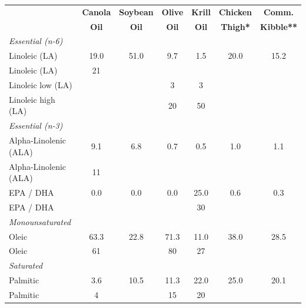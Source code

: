 \begin{table}[h!]
    \small %
    \begin{tabular}{l *{6}{S[table-format=2.1]}}
        \toprule
        \textbf{} & {\textbf{Canola}} & {\textbf{Soybean}} & {\textbf{Olive}} & {\textbf{Krill}} & {\textbf{Chicken}} & {\textbf{Comm.}}\\
        & {\textbf{Oil}} & {\textbf{Oil}} & {\textbf{Oil}} & {\textbf{Oil}} & {\textbf{Thigh*}} & {\textbf{Kibble**}} \\
        \midrule
        \textit{Essential (n-6)} & & & & & & \\
        Linoleic  (LA) & 19.0 & 51.0 & 9.7 & 1.5 & 20.0 & 15.2 \\
        Linoleic  (LA) & 21\cite{Loganes_Ballali_Minto_Main_Properties_Canola_2016} &  &  &  &  &  \\
        Linoleic low   (LA) &  &  &3 \cite{Irmak_Tokusoglu_Saturated_Unsaturated_Fatty_2017} & 3 \cite{Ozbay_Determination_fatty_acid_2026} &  &  \\
        Linoleic high   (LA) &  &  & 20 \cite{Irmak_Tokusoglu_Saturated_Unsaturated_Fatty_2017} & 50 \cite{Ozbay_Determination_fatty_acid_2026} &  &  \\
        \midrule
        \textit{Essential (n-3)} & & & & & & \\
        Alpha-Linolenic (ALA) & 9.1 & 6.8 & 0.7 & 0.5 & 1.0 & 1.1 \\
        Alpha-Linolenic (ALA) & 11 \cite{Loganes_Ballali_Minto_Main_Properties_Canola_2016} &  &  &  &  &  \\
        EPA / DHA & 0.0 & 0.0 & 0.0 & 25.0 & 0.6 & 0.3 \\
        EPA / DHA &  &  &  & 30 \cite{Saryer_charvv351_Yuksel_Comparative_Analysis_2025} &  &  \\
        \midrule
        \textit{Monounsaturated} & & & & & & \\
        Oleic  & 63.3 & 22.8 & 71.3 & 11.0 & 38.0 & 28.5 \\
        Oleic  & 61 \cite{Loganes_Ballali_Minto_Main_Properties_Canola_2016}  &  & 80 \cite{JimenezLopez_Carpena_LourenoLopes_Bioactive_Compounds_Quality_2020} & 27 \cite{Ozbay_Determination_fatty_acid_2026}  &  &  \\
        \midrule
        \textit{Saturated} & & & & & & \\
        Palmitic  & 3.6 & 10.5 & 11.3 & 22.0 & 25.0 & 20.1 \\
        Palmitic  & 4 \cite{ElNakhlawy_Shiboob_Ux062a_char_2011} &  & 15\cite{Irmak_Tokusoglu_Saturated_Unsaturated_Fatty_2017}  &  20  \cite{Ozbay_Determination_fatty_acid_2026} &   &  \\

\end{tabular}
\end{table}
